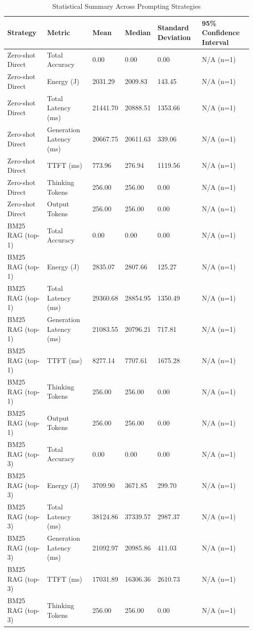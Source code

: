 \begin{table}
\caption{Statistical Summary Across Prompting Strategies}
\label{tab:statistical_summary}
\begin{tabular}{llllll}
\toprule
Strategy & Metric & Mean & Median & Standard Deviation & 95\% Confidence Interval \\
\midrule
Zero-shot Direct & Total Accuracy & 0.00 & 0.00 & 0.00 & N/A (n=1) \\
Zero-shot Direct & Energy (J) & 2031.29 & 2009.83 & 143.45 & N/A (n=1) \\
Zero-shot Direct & Total Latency (ms) & 21441.70 & 20888.51 & 1353.66 & N/A (n=1) \\
Zero-shot Direct & Generation Latency (ms) & 20667.75 & 20611.63 & 339.06 & N/A (n=1) \\
Zero-shot Direct & TTFT (ms) & 773.96 & 276.94 & 1119.56 & N/A (n=1) \\
Zero-shot Direct & Thinking Tokens & 256.00 & 256.00 & 0.00 & N/A (n=1) \\
Zero-shot Direct & Output Tokens & 256.00 & 256.00 & 0.00 & N/A (n=1) \\
BM25 RAG (top-1) & Total Accuracy & 0.00 & 0.00 & 0.00 & N/A (n=1) \\
BM25 RAG (top-1) & Energy (J) & 2835.07 & 2807.66 & 125.27 & N/A (n=1) \\
BM25 RAG (top-1) & Total Latency (ms) & 29360.68 & 28854.95 & 1350.49 & N/A (n=1) \\
BM25 RAG (top-1) & Generation Latency (ms) & 21083.55 & 20796.21 & 717.81 & N/A (n=1) \\
BM25 RAG (top-1) & TTFT (ms) & 8277.14 & 7707.61 & 1675.28 & N/A (n=1) \\
BM25 RAG (top-1) & Thinking Tokens & 256.00 & 256.00 & 0.00 & N/A (n=1) \\
BM25 RAG (top-1) & Output Tokens & 256.00 & 256.00 & 0.00 & N/A (n=1) \\
BM25 RAG (top-3) & Total Accuracy & 0.00 & 0.00 & 0.00 & N/A (n=1) \\
BM25 RAG (top-3) & Energy (J) & 3709.90 & 3671.85 & 299.70 & N/A (n=1) \\
BM25 RAG (top-3) & Total Latency (ms) & 38124.86 & 37339.57 & 2987.37 & N/A (n=1) \\
BM25 RAG (top-3) & Generation Latency (ms) & 21092.97 & 20985.86 & 411.03 & N/A (n=1) \\
BM25 RAG (top-3) & TTFT (ms) & 17031.89 & 16306.36 & 2610.73 & N/A (n=1) \\
BM25 RAG (top-3) & Thinking Tokens & 256.00 & 256.00 & 0.00 & N/A (n=1) \\

\end{tabular}
\end{table}
